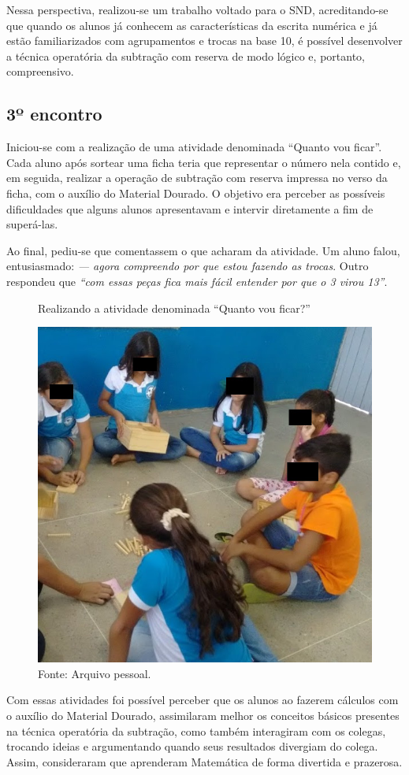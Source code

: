 \begin{refsection}
    Nessa perspectiva, realizou-se um trabalho voltado para o SND, acreditando-se que quando os alunos já conhecem as características da escrita numérica e já estão familiarizados com agrupamentos e trocas na base 10, é possível desenvolver a técnica operatória da subtração com reserva de modo lógico e, portanto, compreensivo.

    \subsection{3º encontro}

    Iniciou-se com a realização de uma atividade denominada “Quanto vou ficar”. Cada aluno após sortear uma ficha teria que representar o número nela contido e, em seguida, realizar a operação de subtração com reserva impressa no verso da ficha, com o auxílio do Material Dourado. O objetivo era perceber as possíveis dificuldades que alguns alunos apresentavam e intervir diretamente a fim de superá-las.  

    Ao final, pediu-se que comentassem o que acharam da atividade. Um aluno falou, entusiasmado: \textit{--- agora compreendo por que estou fazendo as trocas}. Outro respondeu que \textit{``com essas peças fica mais fácil entender por que o 3 virou 13''}.

    \begin{figure}[ht]%
        \centering%
        \caption{Realizando a atividade denominada ``Quanto vou ficar?''}%
        \includegraphics[width=.5\textwidth]{articles/05-material-dourado-com/figura5.jpeg}%
        \caption*{Fonte: Arquivo pessoal.}%
        \label{fig:quanto-vou-ficar}%
    \end{figure}%

    Com essas atividades foi possível perceber que os alunos ao fazerem cálculos com o auxílio do Material Dourado, assimilaram melhor os conceitos básicos presentes na técnica operatória da subtração, como também interagiram com os colegas, trocando ideias e argumentando quando seus resultados divergiam do colega. Assim, consideraram que aprenderam Matemática de forma divertida e prazerosa. 


\end{refsection}
